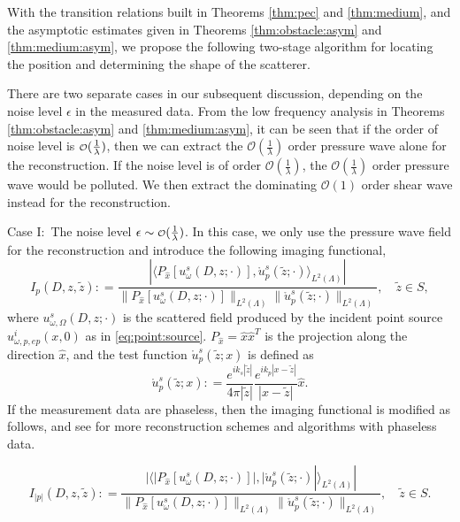 \documentclass[a4paper,11pt]{article}
\newcommand\smallO{
  \mathchoice
    {{\scriptstyle\mathcal{O}}}%
    {{\scriptstyle\mathcal{O}}}%
    {{\scriptscriptstyle\mathcal{O}}}%
    {\scalebox{.7}{$\scriptscriptstyle\mathcal{O}$}}%
  }
\theoremstyle{remark}
\theoremstyle{definition}
\numberwithin{equation}{section}
\begin{document}
With the transition relations built in Theorems \ref{thm:pec} and \ref{thm:medium}, and the asymptotic estimates given in Theorems \ref{thm:obstacle:asym} and \ref{thm:medium:asym}, we propose the following two-stage algorithm for locating the position and determining the shape of the scatterer.

There are two separate cases in our subsequent discussion, depending on the noise level $\epsilon$ in the measured data. From the low frequency analysis in Theorems \ref{thm:obstacle:asym} and \ref{thm:medium:asym}, it can be seen that if the order of noise level is  $\smallO (\frac{1}{\lambda})$, then we can extract the $\mathcal{O}(\frac{1}{\lambda})$ order pressure wave alone for the reconstruction. If the noise level is of order $\mathcal{O}(\frac{1}{\lambda})$, the $\mathcal{O}(\frac{1}{\lambda})$ order pressure wave would be polluted. We then extract the dominating $\mathcal{O}(1)$ order shear wave instead for the reconstruction.

\medskip


Case I:~The noise level $\epsilon \sim  \smallO (\frac{1}{\lambda})$.
In this case, we only use the pressure wave field for the reconstruction and introduce the following imaging functional,
\begin{equation}\label{eq:indicator:p}
I_{p}(D,z, \tilde{z}): = \frac{|\langle P_{\hat{x}}[u_{\omega}^s(D,z;\cdot)], \mathring{u}_{p}^s(\tilde{z};\cdot)\rangle_{L^{2}(\Lambda)} |}{\|P_{\hat{x}}[u_{\omega}^s(D,z;\cdot)]\|_{L^2(\Lambda)} \|\mathring{u}_{p}^s(\tilde{z};\cdot)\|_{L^2(\Lambda)} }, \quad \tilde{z} \in S,
\end{equation}
where $u_{\omega,\Omega}^s(D,z;\cdot) $ is the scattered field produced by the incident point source $u_{\omega, p, ep}^i(x,0)$ as in \eqref{eq:point:source}. $P_{\hat{x}}=\hat{x}\hat{x}^{T}$ is the projection along the direction $\hat{x}$, and the test function $\mathring{u}_{p}^s(\tilde{z};x)$ is defined as
\begin{equation}
\mathring{u}_{p}^s(\tilde{z};x): = \frac{e^{ik_s|\tilde{z}|}}{4\pi |\tilde{z}|} \frac{e^{ik_p|x-\tilde{z}|}}{|x-\tilde{z}|}\hat{x}.
\end{equation}
If the measurement data are phaseless, then the imaging functional is modified as follows, and see \cite{Klib1, Klib2} for more reconstruction schemes and algorithms with phaseless data.

\begin{equation}\label{eq:indicator:p:phaseless}
I_{|p|}(D,z, \tilde{z}): = \frac{|\langle |P_{\hat{x}}[u_{\omega}^s(D,z;\cdot)]|, |\mathring{u}_{p}^s(\tilde{z};\cdot)|\rangle_{L^{2}(\Lambda)} |}{\|P_{\hat{x}}[u_{\omega}^s(D,z;\cdot)]\|_{L^2(\Lambda)} \|\mathring{u}_{p}^s(\tilde{z};\cdot)\|_{L^2(\Lambda)} }, \quad \tilde{z} \in S.
\end{equation}
\medskip
\end{document}
